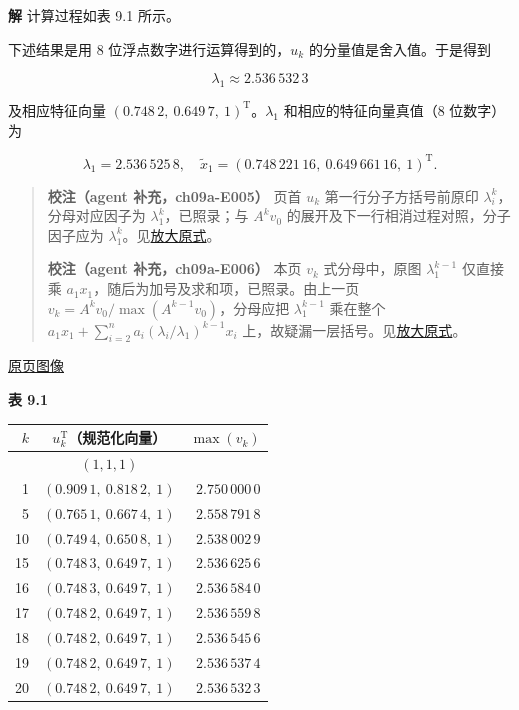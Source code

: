 \documentclass[
  10pt,
  fontset=fandol]{ctexart}
\newcounter{none} %
\begin{document}
\textbf{解} 计算过程如表 9.1 所示。

下述结果是用 8 位浮点数字进行运算得到的，\(u_k\) 的分量值是舍入值。于是得到

\[
\lambda_1\approx2.536\,532\,3
\]

及相应特征向量 \((0.748\,2,\ 0.649\,7,\ 1)^{\mathrm T}\)。\(\lambda_1\) 和相应的特征向量真值（8 位数字）为

\[
\lambda_1=2.536\,525\,8,\quad\widetilde{x}_1=(0.748\,221\,16,\ 0.649\,661\,16,\ 1)^{\mathrm T}.
\]

\begin{quote}
\textbf{校注（agent 补充，ch09a-E005）} 页首 \(u_k\) 第一行分子方括号前原印 \(\lambda_i^k\)，分母对应因子为 \(\lambda_1^k\)，已照录；与 \(A^kv_0\) 的展开及下一行相消过程对照，分子因子应为 \(\lambda_1^k\)。见\href{../assets/ch09a/review-p237-u-k-numerator.png}{放大原式}。

\textbf{校注（agent 补充，ch09a-E006）} 本页 \(v_k\) 式分母中，原图 \(\lambda_1^{k-1}\) 仅直接乘 \(a_1x_1\)，随后为加号及求和项，已照录。由上一页 \(v_k=A^kv_0/\max(A^{k-1}v_0)\)，分母应把 \(\lambda_1^{k-1}\) 乘在整个 \(a_1x_1+\sum_{i=2}^na_i(\lambda_i/\lambda_1)^{k-1}x_i\) 上，故疑漏一层括号。见\href{../assets/ch09a/review-p237-v-k-denominator.png}{放大原式}。
\end{quote}

\href{../../source-images/pdf-238.jpeg}{原页图像}

\textbf{表 9.1}

{\def\LTcaptype{none} %
\begin{longtable}[]{@{}rcr@{}}
\toprule\noalign{}
\(k\) & \(u_k^{\mathrm T}\)（规范化向量） & \(\max(v_k)\) \\
\midrule\noalign{}
\endhead
\bottomrule\noalign{}
\endlastfoot
0 & \((1,1,1)\) & \\
1 & \((0.909\,1,\ 0.818\,2,\ 1)\) & \(2.750\,000\,0\) \\
5 & \((0.765\,1,\ 0.667\,4,\ 1)\) & \(2.558\,791\,8\) \\
10 & \((0.749\,4,\ 0.650\,8,\ 1)\) & \(2.538\,002\,9\) \\
15 & \((0.748\,3,\ 0.649\,7,\ 1)\) & \(2.536\,625\,6\) \\
16 & \((0.748\,3,\ 0.649\,7,\ 1)\) & \(2.536\,584\,0\) \\
17 & \((0.748\,2,\ 0.649\,7,\ 1)\) & \(2.536\,559\,8\) \\
18 & \((0.748\,2,\ 0.649\,7,\ 1)\) & \(2.536\,545\,6\) \\
19 & \((0.748\,2,\ 0.649\,7,\ 1)\) & \(2.536\,537\,4\) \\
20 & \((0.748\,2,\ 0.649\,7,\ 1)\) & \(2.536\,532\,3\) \\
\end{longtable}
}
\end{document}
